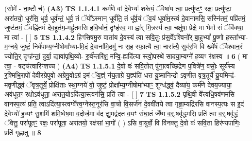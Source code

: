 \documentclass[17pt]{extarticle}
\begin{document}
                  \newline
                      (सोमे॑ - ना॒ष्टौ च॑)  \textbf{(A3)} \newline \newline
                                        \textbf{ TS 1.1.4.1} \newline
                  कर्म॑णे वां दे॒वेभ्यः॑ शकेयं॒ ॅवेषा॑य त्वा॒ प्रत्यु॑ष्टꣳ॒॒ रक्षः॒ प्रत्यु॑ष्टा॒ अरा॑तयो॒ धूर॑सि॒ धूर्व॒ धूर्व॑न्तं॒ धूर्व॒ तं ॅयो᳚ऽस्मान् धूर्व॑ति॒ तं धू᳚र्व॒यं ॅव॒यं धूर्वा॑म॒स्त्वं दे॒वाना॑मसि॒ सस्नि॑तमं॒ पप्रि॑तमं॒ जुष्ट॑तमं॒ ॅवह्नि॑तमं देव॒हूत॑म॒-मह्रु॑तमसि हवि॒र्धानं॒ दृꣳह॑स्व॒ मा ह्वा᳚र् मि॒त्रस्य॑ त्वा॒ चक्षु॑षा॒ प्रेक्षे॒ मा भेर्मा सं ॅवि॑क्था॒ मा त्वा॑ - [ ] \textbf{  5} \newline
                  \newline
                                \textbf{ TS 1.1.4.2} \newline
                  हिꣳसिषमु॒रु वाता॑य दे॒वस्य॑ त्वा सवि॒तुः प्र॑स॒वे᳚ऽश्विनो᳚र् बा॒हुभ्यां᳚ पू॒ष्णो हस्ता᳚भ्या-म॒ग्नये॒ जुष्टं॒ निर्व॑पाम्य॒ग्नीषोमा᳚भ्या-मि॒दं दे॒वाना॑मि॒दमु॑ नः स॒ह स्फा॒त्यै त्वा॒ नारा᳚त्यै॒ सुव॑र॒भि वि ख्ये॑षं ॅवैश्वान॒रं ज्योति॒र् दृꣳह॑न्तां॒ दुर्या॒ द्यावा॑पृथि॒व्यो- रु॒र्व॑न्तरि॑क्ष॒ मन्वि॒-ह्यदि॑त्या स्त्वो॒पस्थे॑ सादया॒म्यग्ने॑ ह॒व्यꣳ र॑क्षस्व ॥ \textbf{  6 } \newline
                  \newline
                      ( मा त्वा॒ - षट्च॑त्वारिꣳशच्च )  \textbf{(A4)} \newline \newline
                                        \textbf{ TS 1.1.5.1} \newline
                  दे॒वो वः॑ सवि॒तोत् पु॑ना॒त्वच्छि॑द्रेण प॒वित्रे॑ण॒ वसोः॒ सूर्य॑स्य र॒श्मिभि॒रापो॑ देवीरग्रेपुवो अग्रेगु॒वोऽग्र॑ इ॒मं ॅय॒ज्ञ्ं न॑य॒ताग्रे॑ य॒ज्ञ्प॑तिं धत्त यु॒ष्मानिन्द्रो॑ ऽवृणीत वृत्र॒तूर्ये॑ यू॒यमिन्द्र॑-मवृणीद्ध्वं ॅवृत्र॒तूर्ये॒ प्रोक्षि॑ताः स्था॒ग्नये॑ वो॒ जुष्टं॒ प्रोक्षा᳚म्य॒ग्नीषोमा᳚भ्याꣳ॒॒ शुन्ध॑द्ध्वं॒ दैव्या॑य॒ कर्म॑णे देवय॒ज्याया॒ अव॑धूतꣳ॒॒ रक्षोऽव॑धूता॒ अरा॑त॒योऽदि॑त्या॒स्त्वग॑सि॒ प्रति॑ त्वा - [ ] \textbf{  7} \newline
                  \newline
                                \textbf{ TS 1.1.5.2} \newline
                  पृथि॒वी वे᳚त्त्वधि॒षव॑णमसि वानस्प॒त्यं प्रति॒ त्वाऽदि॑त्या॒स्त्वग्वे᳚त्त्व॒ग्नेस्त॒नूर॑सि वा॒चो वि॒सर्ज॑नं दे॒ववी॑तये त्वा गृह्णा॒म्यद्रि॑रसि वानस्प॒त्यः स इ॒दं दे॒वेभ्यो॑ ह॒व्यꣳ सु॒शमि॑ शमि॒ष्वेष॒मा व॒दोर्ज॒मा व॑द द्यु॒मद्व॑दत व॒यꣳ सं॑घा॒तं जे᳚ष्म व॒र्॒.षवृ॑द्धमसि॒ प्रति॑ त्वा व॒र्॒.षवृ॑द्धं ॅवेत्तु॒ परा॑पूतꣳ॒॒ रक्षः॒ परा॑पूता॒ अरा॑तयो॒ रक्ष॑सां भा॒गो॑ ( ) ऽसि वा॒युर्वो॒ वि वि॑नक्तु दे॒वो वः॑ सवि॒ता हिर॑ण्यपाणिः॒ प्रति॑ गृह्णातु ॥ \textbf{  8 } \newline
\end{document}
